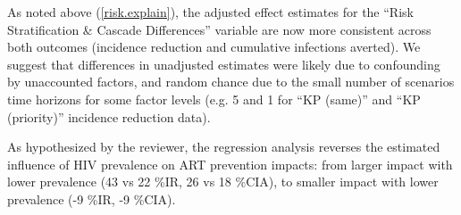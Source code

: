 \begin{comment}
Please elaborate on and support Figure C.11 - it's not immediately clear to me that 'the pattern of incidence reduction versus modelled heterogeneity was similar to the pattern of infections averted versus modelled heterogeneity". Recognising that these data do not stem from the same studies, it is noted that in Table C.1 the incidence reduction increases ~2fold between no risk heterogeneity and activity (no KP), whilst averted infections decreases \textasciitilde4 fold. This would appear to be a key difference?
\end{comment}
\begin{response}
As noted above (\ref{risk.explain}), the adjusted effect estimates for
the ``Risk Stratification \& Cascade Differences'' variable are now more consistent across both outcomes
(incidence reduction and cumulative infections averted).
We suggest that differences in unadjusted estimates were likely due to confounding by unaccounted factors, %
and random chance due to the small number of scenarios time horizons for some factor levels
(e.g. 5 and 1 for ``KP (same)'' and ``KP (priority)'' incidence reduction data).
\end{response}
\begin{comment}
As HIV prevalence is linked to epidemic type, it's interesting that ART prevention impacts were larger with lower HIV prevalence. As the lower prevalence epidemics in West Africa are driven by KPs/more so than the epidemics in ESA, I assume that modelling studies in West Africa are more likely to be KP-disaggregated. However, you have shown that KP-disaggregated models estimate smaller ART prevention impacts. Could this be explored further?
\end{comment}
\begin{response}
As hypothesized by the reviewer,
the regression analysis reverses the estimated influence of HIV prevalence on ART prevention impacts:
from larger impact with lower prevalence (43 vs 22 \%IR, 26 vs 18 \%CIA),
to smaller impact with lower prevalence (-9 \%IR, -9 \%CIA).
\end{response}
\begin{comment}
Whilst recognising this is a scoping review, some more discussion on the impact of these findings for the global HIV response would be welcome. As noted in the discussion, modelled estimates "did not always reflect the available data". The key population estimates (and subsequent estimates of averted HIV transmission) are reliant on weak data and some informed comment on how these results should be used would be good.
\end{comment}
